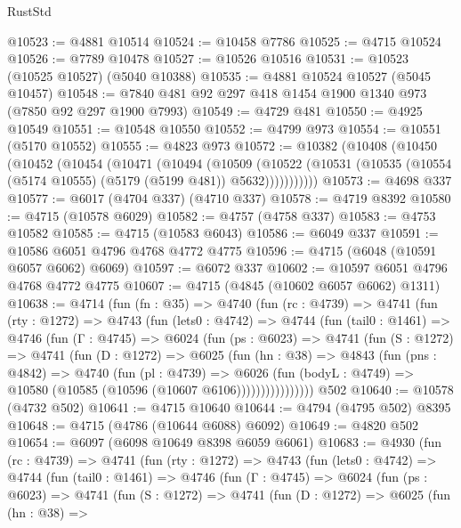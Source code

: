 \begin{lexlean}{RustStd}
\begin{coremodule}
@10523 := @4881 @10514
@10524 := @10458 @7786
@10525 := @4715 @10524
@10526 := @7789 @10478
@10527 := @10526 @10516
@10531 := @10523 (@10525 @10527) (@5040 @10388)
@10535 := @4881 @10524 @10527 (@5045 @10457)
@10548 := @7840 @481 @92 @297 @418 @1454 @1900 @1340 @973 (@7850 @92 @297 @1900 @7993)
@10549 := @4729 @481
@10550 := @4925 @10549
@10551 := @10548 @10550
@10552 := @4799 @973
@10554 := @10551 (@5170 @10552)
@10555 := @4823 @973
@10572 := @10382
    (@10408
      (@10450
        (@10452
          (@10454
            (@10471
              (@10494
                (@10509
                  (@10522
                    (@10531 (@10535 (@10554 (@5174 @10555) (@5179 (@5199 @481)) @5632)))))))))))
@10573 := @4698 @337
@10577 := @6017 (@4704 @337) (@4710 @337)
@10578 := @4719 @8392
@10580 := @4715 (@10578 @6029)
@10582 := @4757 (@4758 @337)
@10583 := @4753 @10582
@10585 := @4715 (@10583 @6043)
@10586 := @6049 @337
@10591 := @10586 @6051 @4796 @4768 @4772 @4775
@10596 := @4715 (@6048 (@10591 @6057 @6062) @6069)
@10597 := @6072 @337
@10602 := @10597 @6051 @4796 @4768 @4772 @4775
@10607 := @4715 (@4845 (@10602 @6057 @6062) @1311)
@10638 := @4714
    (fun (fn : @35) =>
    @4740
      (fun (rc : @4739) =>
      @4741
        (fun (rty : @1272) =>
        @4743
          (fun (lets0 : @4742) =>
          @4744
            (fun (tail0 : @1461) =>
            @4746
              (fun (Γ : @4745) =>
              @6024
                (fun (ps : @6023) =>
                @4741
                  (fun (S : @1272) =>
                  @4741
                    (fun (D : @1272) =>
                    @6025
                      (fun (hn : @38) =>
                      @4843
                        (fun (pns : @4842) =>
                        @4740
                          (fun (pl : @4739) =>
                          @6026
                            (fun (bodyL : @4749) =>
                            @10580 (@10585 (@10596 (@10607 @6106))))))))))))))))
    @502
@10640 := @10578 (@4732 @502)
@10641 := @4715 @10640
@10644 := @4794 (@4795 @502) @8395
@10648 := @4715 (@4786 (@10644 @6088) @6092)
@10649 := @4820 @502
@10654 := @6097 (@6098 @10649 @8398 @6059 @6061)
@10683 := @4930
    (fun (rc : @4739) =>
    @4741
      (fun (rty : @1272) =>
      @4743
        (fun (lets0 : @4742) =>
        @4744
          (fun (tail0 : @1461) =>
          @4746
            (fun (Γ : @4745) =>
            @6024
              (fun (ps : @6023) =>
              @4741
                (fun (S : @1272) =>
                @4741
                  (fun (D : @1272) =>
                  @6025
                    (fun (hn : @38) =>

\end{coremodule}
\end{lexlean}
